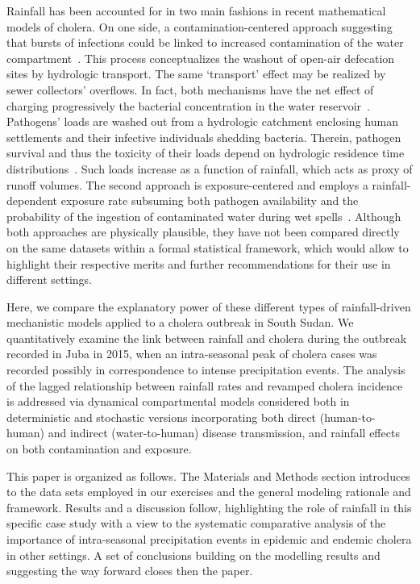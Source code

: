 Rainfall has been accounted for in two main fashions in recent mathematical models of cholera. On one side, a contamination-centered approach suggesting that bursts of infections could be linked to increased contamination of the water compartment~\cite{Rinaldo:Reassessment20102011:2012}. This process conceptualizes the washout of open-air defecation sites by hydrologic transport. The same `transport' effect may be realized by sewer collectors' overflows. In fact, both mechanisms have the net effect of charging progressively the bacterial concentration in the water reservoir~\cite{codeco01}. Pathogens' loads are washed out from a hydrologic catchment enclosing human settlements and their infective individuals shedding bacteria. Therein, pathogen survival and thus the toxicity of their loads depend on hydrologic residence time distributions~\cite{Rinaldo:Reassessment20102011:2012,rinaldoModelingKeyDrivers2017}. Such loads increase as a function of rainfall, which acts as proxy of runoff volumes. The second approach is exposure-centered and employs a rainfall-dependent exposure rate subsuming both pathogen availability and the probability of the ingestion of contaminated water during wet spells~\cite{eisenbergExaminingRainfallCholera2013}. Although both approaches are physically plausible, they have not been compared directly on the same datasets within a formal statistical framework, which would allow to highlight their respective merits and further recommendations for their use in different settings.


Here, we compare the explanatory power of these different types of rainfall-driven mechanistic models applied to a cholera outbreak in South Sudan. We quantitatively examine the link between rainfall and cholera during the outbreak recorded in Juba in 2015, when an intra-seasonal peak of cholera cases was recorded possibly in correspondence to intense precipitation events. The analysis of the lagged relationship between rainfall rates and revamped cholera incidence is addressed via dynamical compartmental models considered both in deterministic and stochastic versions incorporating both direct (human-to-human) and indirect (water-to-human) disease transmission, and rainfall effects on both contamination and exposure.

This paper is organized as follows. The Materials and Methods section introduces to the data sets employed in our exercises and the general modeling rationale and framework. Results and a discussion follow, highlighting the role of rainfall in this specific case study with a view to the systematic comparative analysis of the importance of intra-seasonal precipitation events in epidemic and endemic cholera in other settings. A set of conclusions building on the modelling results and suggesting the way forward closes then the paper. 

